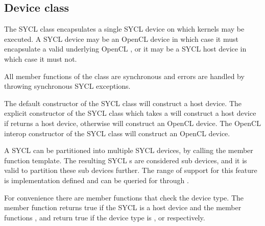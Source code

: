 %



\subsection{Device class}

The SYCL  class encapsulates a single SYCL device on which kernels may be executed. A SYCL device may be an OpenCL device in which case it must encapsulate a valid underlying OpenCL , or it may be a SYCL host device in which case it must not.

All member functions of the  class are synchronous and errors are handled by throwing synchronous SYCL exceptions.

The default constructor of the SYCL  class will construct a
host device. The explicit constructor of the SYCL  class
which takes a  will construct a host device if
 returns a host device, otherwise will construct an
OpenCL device. The OpenCL interop constructor of the SYCL 
class will construct an OpenCL device.

A SYCL  can be partitioned into multiple SYCL devices, by calling the  member function template. The resulting SYCL s are considered sub devices, and it is valid to partition these sub devices further. The range of support for this feature is implementation defined and can be queried for through .

For convenience there are member functions that check the device type. The member function  returns true if the SYCL  is a host device and the member functions ,  and  return true if the device type is ,  or  respectively.

